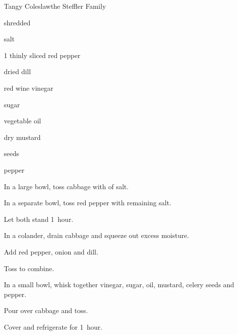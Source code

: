 \begin{recipe}{Tangy Coleslaw}{the Steffler Family}{}

\begin{ingredients}
\item {} shredded 
\item \tp{1\quarter} salt
\item 1 thinly sliced red pepper
\item {} dried dill
\item \C{\quarter} red wine vinegar
\item {} sugar
\item {} vegetable oil
\item {} dry mustard
\item \tp{\threequarter}  seeds
\item \tp{\quarter} pepper
\end{ingredients}

\begin{directions}
\item In a large bowl, toss cabbage with  of salt.
\item In a separate bowl, toss red pepper with remaining salt.
\item Let both stand 1~hour.
\item In a colander, drain cabbage and squeeze out excess moisture.
\item Add red pepper, onion and dill.
\item Toss to combine.
\item In a small bowl, whisk together vinegar, sugar, oil, mustard, celery seeds and pepper.
\item Pour over cabbage and toss.
\item Cover and refrigerate for 1~hour.
\end{directions}

\end{recipe}
